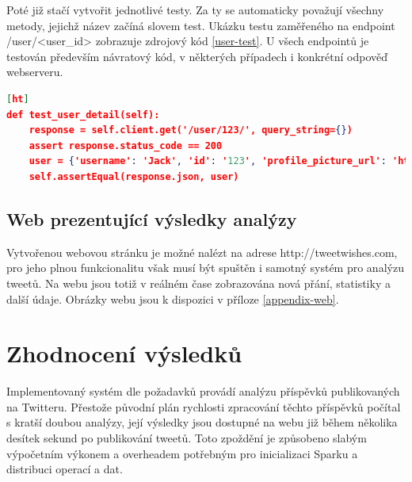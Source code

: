 \documentclass[thesis=B,czech]{FITthesis}[2012/06/26]
\begin{document}
Poté již stačí vytvořit jednotlivé testy. Za ty se automaticky považují všechny metody, jejichž název začíná slovem test. Ukázku testu zaměřeného na endpoint /user/<user\_id> zobrazuje zdrojový kód \ref{user-test}. U všech endpointů je testován především návratový kód, v některých případech i konkrétní odpověď webserveru. 


\begin{lstlisting}[language=json,firstnumber=1][ht]
def test_user_detail(self):
	response = self.client.get('/user/123/', query_string={})
	assert response.status_code == 200
	user = {'username': 'Jack', 'id': '123', 'profile_picture_url': 'http://profile.picture.url'}
	self.assertEqual(response.json, user)
\end{lstlisting}


\section{Web prezentující výsledky analýzy}
Vytvořenou webovou stránku je možné nalézt na adrese http://tweetwishes.com, pro jeho plnou funkcionalitu však musí být spuštěn i samotný systém pro analýzu tweetů. Na webu jsou totiž v reálném čase zobrazována nová přání, statistiky a další údaje. Obrázky webu jsou k dispozici v příloze \ref{appendix-web}. 


\chapter{Zhodnocení výsledků}
\label{zhodnoceni}
Implementovaný systém dle požadavků provádí analýzu příspěvků publikovaných na Twitteru. Přestože původní plán rychlosti zpracování těchto příspěvků počítal s kratší doubou analýzy, její výsledky jsou dostupné na webu již během několika desítek sekund po publikování tweetů. Toto zpoždění je způsobeno slabým výpočetním výkonem a overheadem potřebným pro inicializaci Sparku a distribuci operací a dat. 
\end{document}
